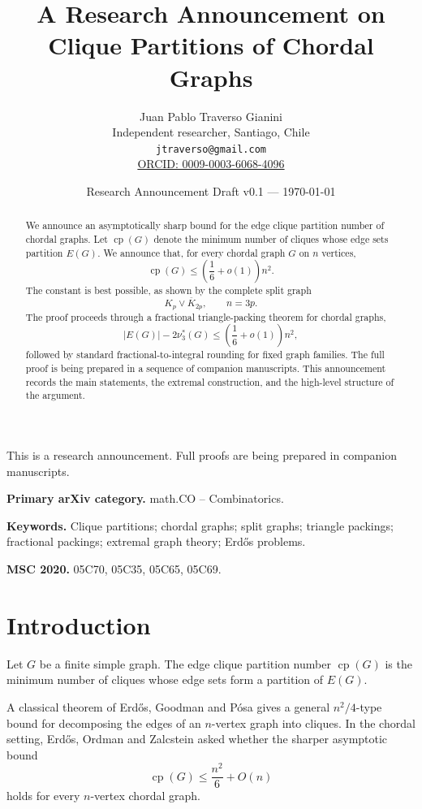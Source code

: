 \documentclass[11pt]{article}
\title{A Research Announcement on Clique Partitions of Chordal Graphs}
\author{
Juan Pablo Traverso Gianini\\
Independent researcher, Santiago, Chile\\
\texttt{jtraverso@gmail.com}\\
\href{https://orcid.org/0009-0003-6068-4096}{ORCID: 0009-0003-6068-4096}
}
\date{Research Announcement Draft v0.1 --- \today}
\newcommand{\cp}{\operatorname{cp}}
\begin{document}
\maketitle

\begin{center}
{\small This is a research announcement. Full proofs are being prepared in companion manuscripts.}
\end{center}

\noindent\textbf{Primary arXiv category.} math.CO -- Combinatorics.

\medskip

\noindent\textbf{Keywords.}
Clique partitions; chordal graphs; split graphs; triangle packings; fractional packings; extremal graph theory; Erdős problems.

\medskip

\noindent\textbf{MSC 2020.}
05C70, 05C35, 05C65, 05C69.

\begin{abstract}
We announce an asymptotically sharp bound for the edge clique partition number of chordal graphs. Let \(\cp(G)\) denote the minimum number of cliques whose edge sets partition \(E(G)\). We announce that, for every chordal graph \(G\) on \(n\) vertices,
\[
    \cp(G)\le \left(\frac16+o(1)\right)n^2.
\]
The constant is best possible, as shown by the complete split graph
\[
    K_p\vee\overline{K}_{2p},\qquad n=3p.
\]
The proof proceeds through a fractional triangle-packing theorem for chordal graphs,
\[
    |E(G)|-2\nu_3^*(G)\le \left(\frac16+o(1)\right)n^2,
\]
followed by standard fractional-to-integral rounding for fixed graph families. The full proof is being prepared in a sequence of companion manuscripts. This announcement records the main statements, the extremal construction, and the high-level structure of the argument.
\end{abstract}

\section{Introduction}

Let \(G\) be a finite simple graph. The edge clique partition number \(\cp(G)\) is the minimum number of cliques whose edge sets form a partition of \(E(G)\).

A classical theorem of Erdős, Goodman and Pósa gives a general \(n^2/4\)-type bound for decomposing the edges of an \(n\)-vertex graph into cliques. In the chordal setting, Erdős, Ordman and Zalcstein asked whether the sharper asymptotic bound
\[
    \cp(G)\le \frac{n^2}{6}+O(n)
\]
holds for every \(n\)-vertex chordal graph.
\end{document}
